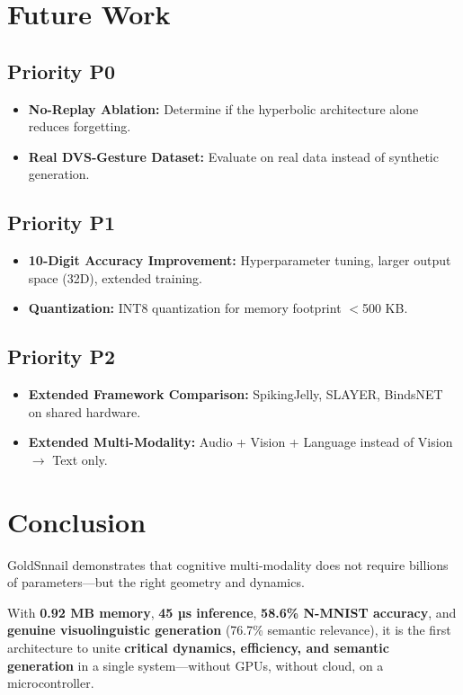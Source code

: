 \documentclass[conference]{IEEEtran}
\begin{document}
\section{Future Work}

\subsection{Priority P0}
\begin{itemize}
    \item \textbf{No-Replay Ablation:} Determine if the hyperbolic architecture alone reduces forgetting.
    \item \textbf{Real DVS-Gesture Dataset:} Evaluate on real data instead of synthetic generation.
\end{itemize}

\subsection{Priority P1}
\begin{itemize}
    \item \textbf{10-Digit Accuracy Improvement:} Hyperparameter tuning, larger output space (32D), extended training.
    \item \textbf{Quantization:} INT8 quantization for memory footprint $<$500 KB.
\end{itemize}

\subsection{Priority P2}
\begin{itemize}
    \item \textbf{Extended Framework Comparison:} SpikingJelly, SLAYER, BindsNET on shared hardware.
    \item \textbf{Extended Multi-Modality:} Audio + Vision + Language instead of Vision $\rightarrow$ Text only.
\end{itemize}

\section{Conclusion}

GoldSnnail demonstrates that cognitive multi-modality does not require billions of parameters---but the right geometry and dynamics.

With \textbf{0.92 MB memory}, \textbf{45 µs inference}, \textbf{58.6\% N-MNIST accuracy}, and \textbf{genuine visuolinguistic generation} (76.7\% semantic relevance), it is the first architecture to unite \textbf{critical dynamics, efficiency, and semantic generation} in a single system---without GPUs, without cloud, on a microcontroller.
\end{document}
